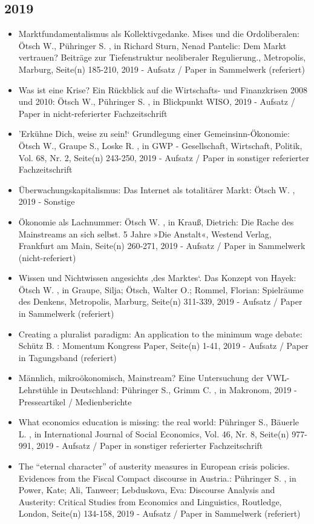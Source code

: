  \subsection{2019} 
 \begin{itemize} 
	 \item Marktfundamentalismus als Kollektivgedanke. Mises und die Ordoliberalen: Ötsch W., Pühringer S. , in Richard Sturn, Nenad Pantelic: Dem Markt vertrauen? Beiträge zur Tiefenstruktur neoliberaler Regulierung., Metropolis, Marburg, Seite(n) 185-210, 2019 - Aufsatz / Paper in Sammelwerk (referiert)
	 \item Was ist eine Krise? Ein Rückblick auf die Wirtschafts- und Finanzkrisen 2008 und 2010: Ötsch W., Pühringer S. , in Blickpunkt WISO, 2019 - Aufsatz / Paper in nicht-referierter Fachzeitschrift
	 \item ’Erkühne Dich, weise zu sein!‘ Grundlegung einer Gemeinsinn-Ökonomie: Ötsch W., Graupe S., Loske R. , in GWP - Gesellschaft, Wirtschaft, Politik, Vol. 68, Nr. 2, Seite(n) 243-250, 2019 - Aufsatz / Paper in sonstiger referierter Fachzeitschrift
	 \item Überwachungskapitalismus: Das Internet als totalitärer Markt: Ötsch W. , 2019 - Sonstige
	 \item Ökonomie als Lachnummer: Ötsch W. , in Krauß, Dietrich: Die Rache des Mainstreams an sich selbst. 5 Jahre »Die Anstalt«, Westend Verlag, Frankfurt am Main, Seite(n) 260-271, 2019 - Aufsatz / Paper in Sammelwerk (nicht-referiert)
	 \item Wissen und Nichtwissen angesichts ‚des Marktes‘. Das Konzept von Hayek: Ötsch W. , in Graupe, Silja; Ötsch, Walter O.; Rommel, Florian: Spielräume des Denkens, Metropolis, Marburg, Seite(n) 311-339, 2019 - Aufsatz / Paper in Sammelwerk (referiert)
	 \item Creating a pluralist paradigm: An application to the minimum wage debate: Schütz B. : Momentum Kongress Paper, Seite(n) 1-41, 2019 - Aufsatz / Paper in Tagungsband (referiert)
	 \item Männlich, mikroökonomisch, Mainstream? Eine Untersuchung der VWL-Lehrstühle in Deutschland: Pühringer S., Grimm C. , in Makronom, 2019 - Presseartikel / Medienberichte
	 \item What economics education is missing: the real world: Pühringer S., Bäuerle L. , in International Journal of Social Economics, Vol. 46, Nr. 8, Seite(n) 977-991, 2019 - Aufsatz / Paper in sonstiger referierter Fachzeitschrift
	 \item The “eternal character” of austerity measures in European crisis policies. Evidences from the Fiscal Compact discourse in Austria.: Pühringer S. , in Power, Kate; Ali, Tanweer; Lebduskova, Eva: Discourse Analysis and Austerity: Critical Studies from Economics and Linguistics, Routledge, London, Seite(n) 134-158, 2019 - Aufsatz / Paper in Sammelwerk (referiert)

\end{itemize}
